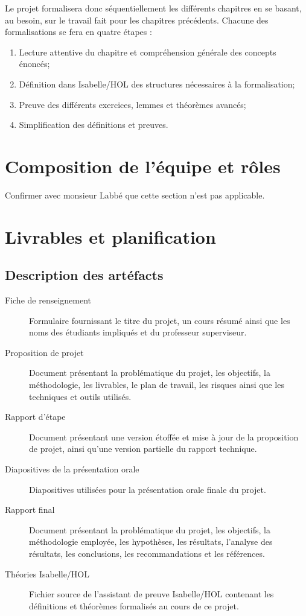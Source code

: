 \documentclass[a4paper, oneside, 12pt, titlepage, draft]{article}
\begin{document}
Le projet formalisera donc séquentiellement les différents chapitres en se basant, au besoin, sur le
travail fait pour les chapitres précédents. Chacune des formalisations se fera en quatre étapes :

\begin{enumerate}
  \item Lecture attentive du chapitre et compréhension générale des concepts énoncés;
  \item Définition dans Isabelle/HOL des structures nécessaires à la formalisation;
  \item Preuve des différents exercices, lemmes et théorèmes avancés;
  \item Simplification des définitions et preuves.
\end{enumerate}

\section{Composition de l'équipe et rôles}

Confirmer avec monsieur Labbé que cette section n'est pas applicable.

\section{Livrables et planification}

\subsection{Description des artéfacts}


\begin{description}
  \item[Fiche de renseignement]
    Formulaire fournissant le titre du projet, un cours résumé ainsi que les noms des étudiants
    impliqués et du professeur superviseur.
  \item[Proposition de projet]
    Document présentant la problématique du projet, les objectifs, la méthodologie, les livrables,
    le plan de travail, les risques ainsi que les techniques et outils utilisés.
  \item[Rapport d'étape]
    Document présentant une version étoffée et mise à jour de la proposition de projet, ainsi qu'une
    version partielle du rapport technique.
  \item[Diapositives de la présentation orale]
    Diapositives utilisées pour la présentation orale finale du projet.
  \item[Rapport final]
    Document présentant la problématique du projet, les objectifs, la méthodologie employée, les
    hypothèses, les résultats, l'analyse des résultats, les conclusions, les recommandations et les
    références.
  \item[Théories Isabelle/HOL]
    Fichier source de l'assistant de preuve Isabelle/HOL contenant les définitions et théorèmes
    formalisés au cours de ce projet.
\end{description}
\end{document}
